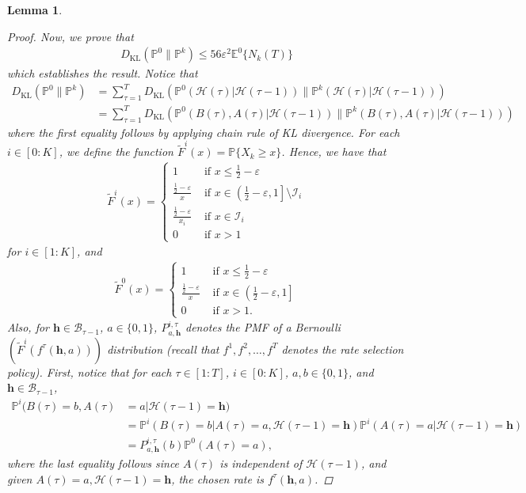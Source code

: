 \documentclass[12pt,draftcls, onecolumn]{IEEEtran}
\renewcommand{\vec}[1]{\ensuremath{\boldsymbol{#1}}}
\newtheorem{lemma}{Lemma}
\begin{document}
{\begin{lemma}
\begin{proof}
Now, we prove that
\begin{align}\label{eqn:to_est}
    D_{\text{KL}}(\mathbb{P}^0\lVert \mathbb{P}^k) \leq 56\varepsilon^2\mathbb{E}^0\{N_k(T)\}
\end{align}
which establishes the result. 
Notice that
\begin{align}\label{eqn:orig_eq}
    D_{\text{KL}}(\mathbb{P}^0\lVert \mathbb{P}^k) &= \sum_{\tau =1 }^T D_{\text{KL}}(\mathbb{P}^0(\mathcal{H}(\tau)|\mathcal{H}(\tau-1))\lVert \mathbb{P}^k(\mathcal{H}(\tau)|\mathcal{H}(\tau-1)))\nonumber\\& = \sum_{\tau = 1}^T  D_{\text{KL}}(\mathbb{P}^0(B(\tau), A(\tau)|\mathcal{H}(\tau-1))\lVert \mathbb{P}^k(B(\tau),A(\tau)|\mathcal{H}(\tau-1)))
\end{align}
where the first equality follows by applying chain rule of KL divergence. For each $i \in [0:K]$, we  define the function $\tilde{F}^i(x) = \mathbb{P}\{X_k \geq x\}$. Hence, we have that
\begin{align}
    \tilde{F}^i(x) = \begin{cases}
        1 & \text{ if } x \leq \frac{1}{2} - \varepsilon\\
        \frac{\frac{1}{2}-\varepsilon}{x} & \text{ if }x \in \left(\frac{1}{2} - \varepsilon ,1\right]\setminus \mathcal{I}_i\\
         \frac{\frac{1}{2}-\varepsilon}{x_i}& \text{ if }x \in \mathcal{I}_i\\
         0 & \text{ if } x > 1
    \end{cases} \nonumber
\end{align}
for $i \in [1:K]$, and
\begin{align}
    \tilde{F}^0(x) = \begin{cases}
        1 & \text{ if } x \leq \frac{1}{2} - \varepsilon\\
        \frac{\frac{1}{2}-\varepsilon}{x} & \text{ if }x \in \left(\frac{1}{2} - \varepsilon ,1\right]\\
         0 & \text{ if } x > 1.
    \end{cases} \nonumber
\end{align}
Also, for $\vec{h} \in \mathcal{B}_{\tau-1}$, $a \in \{0,1\}$, $P^{i,\tau}_{a,\vec{h}}$ denotes the PMF of a Bernoulli$(\tilde{F}^i(f^{\tau}(\vec{h},a)))$ distribution (recall that $f^{1},f^2,\dots, f^{T}$ denotes the rate selection policy). First, notice that for each $\tau \in [1:T]$, $i \in [0:K]$, $a,b \in \{0,1\}$, and $\vec{h} \in \mathcal{B}_{\tau-1}$,
\begin{align}\label{eqn:imp_equation}
    \mathbb{P}^i(B(\tau) = b,A(\tau)& = a|\mathcal{H}(\tau-1) = \vec{h}) \nonumber\\& =\mathbb{P}^i(B(\tau) = b|A(\tau) = a,\mathcal{H}(\tau-1)= \vec{h})\mathbb{P}^i(A(\tau) = a|\mathcal{H}(\tau-1) = \vec{h})\nonumber\\& = P^{i,\tau}_{a,\vec{h}}(b)\mathbb{P}^0(A(\tau) = a), 
\end{align}
where the last equality follows since $A(\tau)$ is independent of $\mathcal{H}(\tau-1)$, and given $A(\tau) = a,\mathcal{H}(\tau-1)= \vec{h}$, the chosen rate is $f^{\tau}(\vec{h},a)$.


\end{proof}
\end{lemma}}
\end{document}
